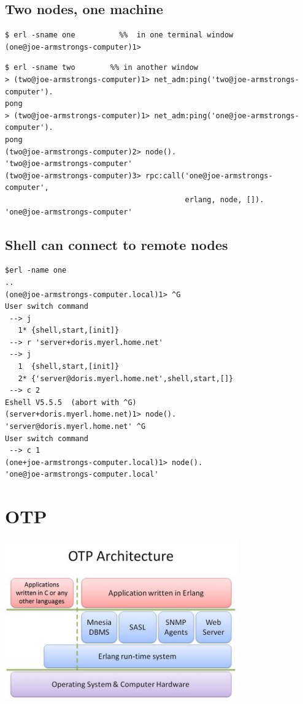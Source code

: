 \documentclass[12pt]{article}
\begin{document}
\subsection{Two nodes, one machine}

\begin{verbatim}
$ erl -sname one          %%  in one terminal window
(one@joe-armstrongs-computer)1> 
\end{verbatim}


\begin{verbatim}
$ erl -sname two        %% in another window
> (two@joe-armstrongs-computer)1> net_adm:ping('two@joe-armstrongs-computer').
pong
> (two@joe-armstrongs-computer)1> net_adm:ping('one@joe-armstrongs-computer').
pong
(two@joe-armstrongs-computer)2> node().
'two@joe-armstrongs-computer'
(two@joe-armstrongs-computer)3> rpc:call('one@joe-armstrongs-computer', 
                                         erlang, node, []).
'one@joe-armstrongs-computer'
\end{verbatim}


\subsection{Shell can connect to remote nodes}

\begin{verbatim}
$erl -name one
..
(one@joe-armstrongs-computer.local)1> ^G
User switch command
 --> j
   1* {shell,start,[init]}
 --> r 'server+doris.myerl.home.net'
 --> j
   1  {shell,start,[init]}
   2* {'server@doris.myerl.home.net',shell,start,[]}
 --> c 2
Eshell V5.5.5  (abort with ^G)
(server+doris.myerl.home.net)1> node().
'server@doris.myerl.home.net' ^G
User switch command
 --> c 1
(one+joe-armstrongs-computer.local)1> node().
'one@joe-armstrongs-computer.local'
\end{verbatim}

\section{OTP}

\includegraphics[width=10cm]{images/OTP_Arch.jpg}
\end{document}
